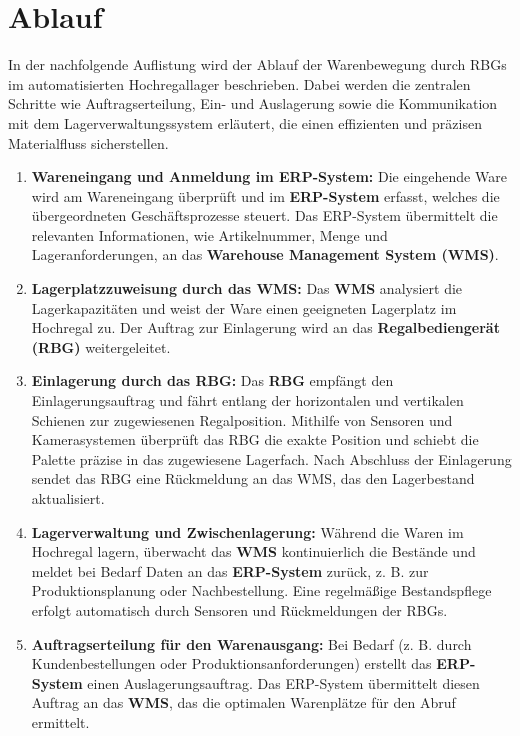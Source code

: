 \section{Ablauf}



	In der nachfolgende Auflistung wird der Ablauf der Warenbewegung durch RBGs im automatisierten Hochregallager beschrieben. Dabei werden die zentralen Schritte wie Auftragserteilung, Ein- und Auslagerung sowie die Kommunikation mit dem Lagerverwaltungssystem erläutert, die einen effizienten und präzisen Materialfluss sicherstellen.
\begin{enumerate}
	\item \textbf{Wareneingang und Anmeldung im ERP-System:}  
	Die eingehende Ware wird am Wareneingang überprüft und im \textbf{ERP-System} erfasst, welches die übergeordneten Geschäftsprozesse steuert. Das ERP-System übermittelt die relevanten Informationen, wie Artikelnummer, Menge und Lageranforderungen, an das \textbf{Warehouse Management System (WMS)}.
	
	\item \textbf{Lagerplatzzuweisung durch das WMS:}  
	Das \textbf{WMS} analysiert die Lagerkapazitäten und weist der Ware einen geeigneten Lagerplatz im Hochregal zu. Der Auftrag zur Einlagerung wird an das \textbf{Regalbediengerät (RBG)} weitergeleitet.
	
	\item \textbf{Einlagerung durch das RBG:}  
	Das \textbf{RBG} empfängt den Einlagerungsauftrag und fährt entlang der horizontalen und vertikalen Schienen zur zugewiesenen Regalposition. Mithilfe von Sensoren und Kamerasystemen überprüft das RBG die exakte Position und schiebt die Palette präzise in das zugewiesene Lagerfach. Nach Abschluss der Einlagerung sendet das RBG eine Rückmeldung an das WMS, das den Lagerbestand aktualisiert.
	
	\item \textbf{Lagerverwaltung und Zwischenlagerung:}  
	Während die Waren im Hochregal lagern, überwacht das \textbf{WMS} kontinuierlich die Bestände und meldet bei Bedarf Daten an das \textbf{ERP-System} zurück, z. B. zur Produktionsplanung oder Nachbestellung. Eine regelmäßige Bestandspflege erfolgt automatisch durch Sensoren und Rückmeldungen der RBGs.
	
	\item \textbf{Auftragserteilung für den Warenausgang:}  
	Bei Bedarf (z. B. durch Kundenbestellungen oder Produktionsanforderungen) erstellt das \textbf{ERP-System} einen Auslagerungsauftrag. Das ERP-System übermittelt diesen Auftrag an das \textbf{WMS}, das die optimalen Warenplätze für den Abruf ermittelt.
	

\end{enumerate}
